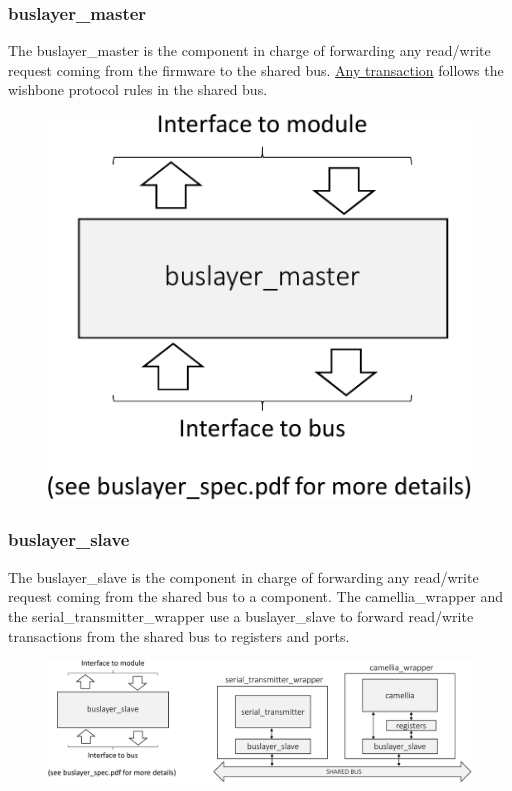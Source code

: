 \documentclass{beamer}
\begin{document}
\begin{frame}
\frametitle{buslayer\_master}
The buslayer\_master is the component in charge of forwarding any read/write request
coming from the firmware to the shared bus. \underline{Any transaction} follows the
wishbone protocol rules in the shared bus.
 
\begin{figure}
	\centering
	\includegraphics[width=0.4\columnwidth]{figures/buslayer_master-crop.pdf}
\end{figure}

\end{frame}

\begin{frame}
\frametitle{buslayer\_slave}
The buslayer\_slave is the component in charge of forwarding any read/write request
coming from the shared bus to a component. 
The camellia\_wrapper and the serial\_transmitter\_wrapper use a buslayer\_slave to
forward read/write transactions from the shared bus to registers and ports. 

\begin{figure}
	\centering
	\includegraphics[width=0.9\columnwidth]{figures/buslayer_slave-crop.pdf}
\end{figure}


\end{frame}
\end{document}
